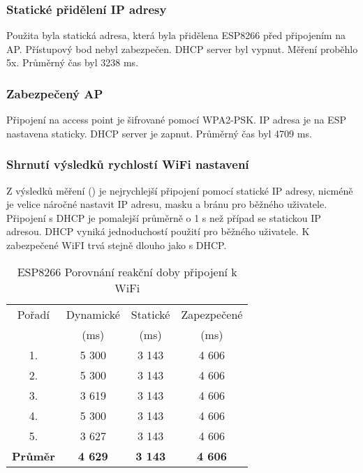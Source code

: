 \documentclass[a4paper, 12pt]{report}
\begin{document}
				\subsubsection{Statické přidělení IP adresy}
					Použita byla statická adresa, která byla přidělena ESP8266 před připojením na AP. Přístupový bod nebyl zabezpečen. DHCP server byl vypnut.
					Měření proběhlo 5x. Průměrný čas byl 3238 \si{ms}.\\

				\subsubsection{Zabezpečený AP}
						Připojení na access point je šifrované pomocí WPA2-PSK. IP adresa je na ESP nastavena staticky. DHCP server je zapnut.
						Průměrný čas byl 4709 \si{ms}.\\

				\subsubsection{Shrnutí výsledků rychlostí WiFi nastavení}
					Z výsledků měření () je nejrychlejší připojení pomocí statické IP adresy, nicméně je velice náročné nastavit IP adresu, masku a bránu pro běžného uživatele. Připojení s DHCP je pomalejší průměrně o 1 \si{s} než případ se statickou IP adresou. DHCP vyniká jednoduchostí použití pro běžného uživatele. K zabezpečené WiFI trvá stejně dlouho jako s DHCP.

					\begin{table}[]
						\centering
						\caption{ESP8266 Porovnání reakční doby připojení k WiFi}
						\begin{tabular}{||c|c c c||}
							\hline
							Pořadí & Dynamické & Statické & Zapezpečené\\
							& (ms) & (ms) & (ms)\\
							\hline

							1. & 5 300 & 3 143 & 4 606\\
							2. & 5 300 & 3 143 & 4 606\\
							3. & 3 619 & 3 143 & 4 606\\
							4. & 5 300 & 3 143 & 4 606\\
							5. & 3 627 & 3 143 & 4 606\\
							\hline
							{\bf Průměr} & {\bf 4 629} & {\bf 3 143} & {\bf 4 606}\\
							\hline

						\end{tabular}
						\label{WiFi porovnání v sekundách}
					\end{table}
\end{document}
